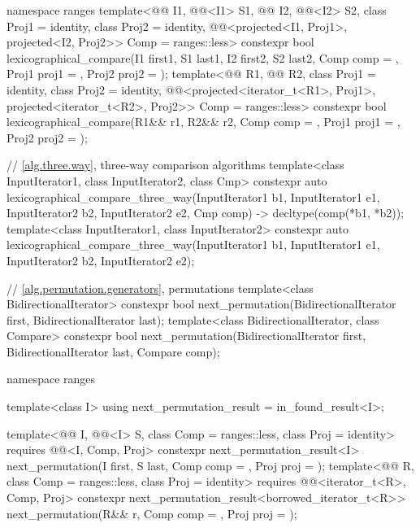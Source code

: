 \begin{codeblock}
{  namespace ranges {
    template<@@ I1, @@<I1> S1, @@ I2, @@<I2> S2,
             class Proj1 = identity, class Proj2 = identity,
             @@<projected<I1, Proj1>, projected<I2, Proj2>> Comp =
               ranges::less>
      constexpr bool
        lexicographical_compare(I1 first1, S1 last1, I2 first2, S2 last2,
                                Comp comp = {}, Proj1 proj1 = {}, Proj2 proj2 = {});
    template<@@ R1, @@ R2, class Proj1 = identity,
             class Proj2 = identity,
             @@<projected<iterator_t<R1>, Proj1>,
                                        projected<iterator_t<R2>, Proj2>> Comp = ranges::less>
      constexpr bool
        lexicographical_compare(R1&& r1, R2&& r2, Comp comp = {},
                                Proj1 proj1 = {}, Proj2 proj2 = {});
  }

  // \ref{alg.three.way}, three-way comparison algorithms
  template<class InputIterator1, class InputIterator2, class Cmp>
    constexpr auto
      lexicographical_compare_three_way(InputIterator1 b1, InputIterator1 e1,
                                        InputIterator2 b2, InputIterator2 e2,
                                        Cmp comp)
        -> decltype(comp(*b1, *b2));
  template<class InputIterator1, class InputIterator2>
    constexpr auto
      lexicographical_compare_three_way(InputIterator1 b1, InputIterator1 e1,
                                        InputIterator2 b2, InputIterator2 e2);

  // \ref{alg.permutation.generators}, permutations
  template<class BidirectionalIterator>
    constexpr bool next_permutation(BidirectionalIterator first,
                                    BidirectionalIterator last);
  template<class BidirectionalIterator, class Compare>
    constexpr bool next_permutation(BidirectionalIterator first,
                                    BidirectionalIterator last, Compare comp);

  namespace ranges {
    template<class I>
      using next_permutation_result = in_found_result<I>;

    template<@@ I, @@<I> S, class Comp = ranges::less,
             class Proj = identity>
      requires @@<I, Comp, Proj>
      constexpr next_permutation_result<I>
        next_permutation(I first, S last, Comp comp = {}, Proj proj = {});
    template<@@ R, class Comp = ranges::less,
             class Proj = identity>
      requires @@<iterator_t<R>, Comp, Proj>
      constexpr next_permutation_result<borrowed_iterator_t<R>>
        next_permutation(R&& r, Comp comp = {}, Proj proj = {});
  }

}
\end{codeblock}
